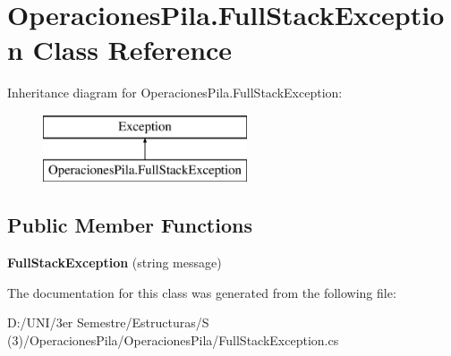 \hypertarget{class_operaciones_pila_1_1_full_stack_exception}{}\section{Operaciones\+Pila.\+Full\+Stack\+Exception Class Reference}
\label{class_operaciones_pila_1_1_full_stack_exception}
Inheritance diagram for Operaciones\+Pila.\+Full\+Stack\+Exception\+:\begin{figure}[H]
\begin{center}
\leavevmode
\includegraphics[height=2.000000cm]{class_operaciones_pila_1_1_full_stack_exception}
\end{center}
\end{figure}
\subsection*{Public Member Functions}
\begin{DoxyCompactItemize}
\item 
\mbox{\label{class_operaciones_pila_1_1_full_stack_exception_a33d1e96f2e234cc2323a0409cedae4f7}} 
{\bfseries Full\+Stack\+Exception} (string message)
\end{DoxyCompactItemize}


The documentation for this class was generated from the following file\+:\begin{DoxyCompactItemize}
\item 
D\+:/\+U\+N\+I/3er Semestre/\+Estructuras/\+S (3)/\+Operaciones\+Pila/\+Operaciones\+Pila/Full\+Stack\+Exception.\+cs\end{DoxyCompactItemize}
